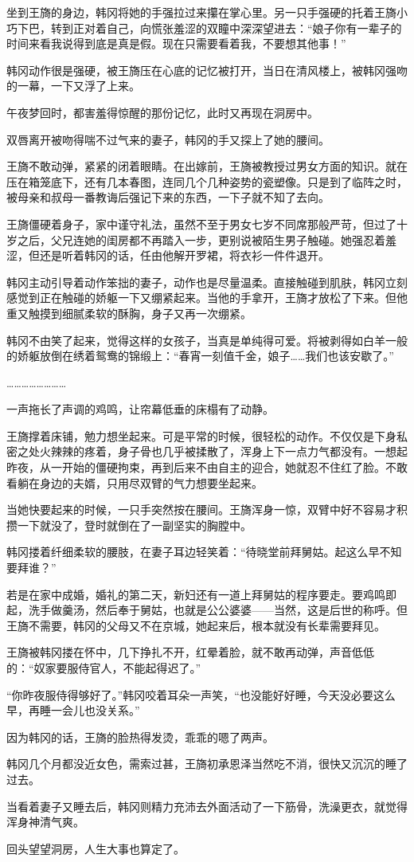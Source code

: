 坐到王旖的身边，韩冈将她的手强拉过来攥在掌心里。另一只手强硬的托着王旖小巧下巴，转到正对着自己，向慌张羞涩的双瞳中深深望进去：“娘子你有一辈子的时间来看我说得到底是真是假。现在只需要看着我，不要想其他事！”

韩冈动作很是强硬，被王旖压在心底的记忆被打开，当日在清风楼上，被韩冈强吻的一幕，一下又浮了上来。

午夜梦回时，都害羞得惊醒的那份记忆，此时又再现在洞房中。

双唇离开被吻得喘不过气来的妻子，韩冈的手又探上了她的腰间。

王旖不敢动弹，紧紧的闭着眼睛。在出嫁前，王旖被教授过男女方面的知识。就在压在箱笼底下，还有几本春图，连同几个几种姿势的瓷塑像。只是到了临阵之时，被母亲和叔母一番教诲后强记下来的东西，一下子就不知了去向。

王旖僵硬着身子，家中谨守礼法，虽然不至于男女七岁不同席那般严苛，但过了十岁之后，父兄连她的闺房都不再踏入一步，更别说被陌生男子触碰。她强忍着羞涩，但还是听着韩冈的话，任由他解开罗裙，将衣衫一件件退开。

韩冈主动引导着动作笨拙的妻子，动作也是尽量温柔。直接触碰到肌肤，韩冈立刻感觉到正在触碰的娇躯一下又绷紧起来。当他的手拿开，王旖才放松了下来。但他重又触摸到细腻柔软的酥胸，身子又再一次绷紧。

韩冈不由笑了起来，觉得这样的女孩子，当真是单纯得可爱。将被剥得如白羊一般的娇躯放倒在绣着鸳鸯的锦缎上：“春宵一刻值千金，娘子……我们也该安歇了。”

……………………

一声拖长了声调的鸡鸣，让帘幕低垂的床榻有了动静。

王旖撑着床铺，勉力想坐起来。可是平常的时候，很轻松的动作。不仅仅是下身私密之处火辣辣的疼着，身子骨也几乎被揉散了，浑身上下一点力气都没有。一想起昨夜，从一开始的僵硬拘束，再到后来不由自主的迎合，她就忍不住红了脸。不敢看躺在身边的夫婿，只用尽双臂的气力想要坐起来。

当她快要起来的时候，一只手突然按在腰间。王旖浑身一惊，双臂中好不容易才积攒一下就没了，登时就倒在了一副坚实的胸膛中。

韩冈搂着纤细柔软的腰肢，在妻子耳边轻笑着：“待晓堂前拜舅姑。起这么早不知要拜谁？”

若是在家中成婚，婚礼的第二天，新妇还有一道上拜舅姑的程序要走。要鸡鸣即起，洗手做羹汤，然后奉于舅姑，也就是公公婆婆——当然，这是后世的称呼。但王旖不需要，韩冈的父母又不在京城，她起来后，根本就没有长辈需要拜见。

王旖被韩冈搂在怀中，几下挣扎不开，红晕着脸，就不敢再动弹，声音低低的：“奴家要服侍官人，不能起得迟了。”

“你昨夜服侍得够好了。”韩冈咬着耳朵一声笑，“也没能好好睡，今天没必要这么早，再睡一会儿也没关系。”

因为韩冈的话，王旖的脸热得发烫，乖乖的嗯了两声。

韩冈几个月都没近女色，需索过甚，王旖初承恩泽当然吃不消，很快又沉沉的睡了过去。

当看着妻子又睡去后，韩冈则精力充沛去外面活动了一下筋骨，洗澡更衣，就觉得浑身神清气爽。

回头望望洞房，人生大事也算定了。


